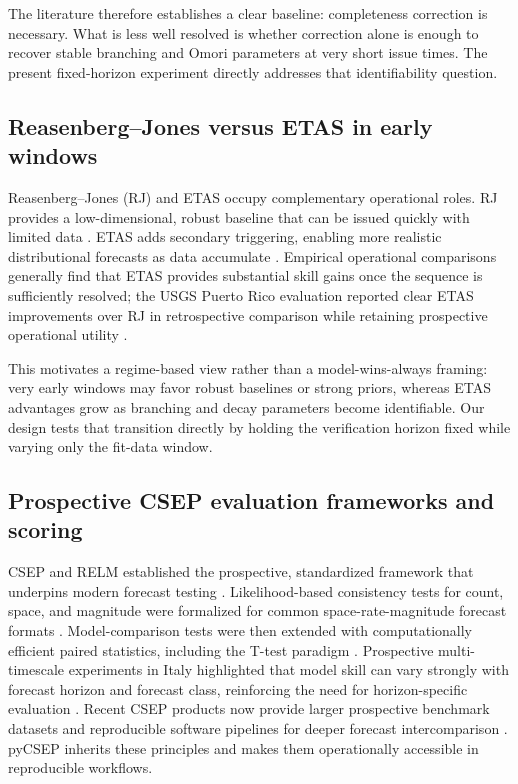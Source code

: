 \documentclass[12pt,letterpaper]{article}
\begin{document}
The literature therefore establishes a clear baseline: completeness correction
is necessary. What is less well resolved is whether correction alone is enough
to recover stable branching and Omori parameters at very short issue times.
The present fixed-horizon experiment directly addresses that identifiability
question.

\subsection{Reasenberg--Jones versus ETAS in early windows}

Reasenberg--Jones (RJ) and ETAS occupy complementary operational roles.
RJ provides a low-dimensional, robust baseline that can be issued quickly with
limited data \cite{reasenberg1989}. ETAS adds secondary triggering, enabling
more realistic distributional forecasts as data accumulate
\cite{ogata1988,ogata2006}. Empirical operational comparisons generally find
that ETAS provides substantial skill gains once the sequence is sufficiently
resolved; the USGS Puerto Rico evaluation reported clear ETAS improvements over
RJ in retrospective comparison while retaining prospective operational utility
\cite{puertorico2022}.

This motivates a regime-based view rather than a model-wins-always framing:
very early windows may favor robust baselines or strong priors, whereas ETAS
advantages grow as branching and decay parameters become identifiable.
Our design tests that transition directly by holding the verification horizon
fixed while varying only the fit-data window.

\subsection{Prospective CSEP evaluation frameworks and scoring}

CSEP and RELM established the prospective, standardized framework that underpins
modern forecast testing \cite{schorlemmer2007relm,schorlemmer2010relm}.
Likelihood-based consistency tests for count, space, and magnitude were
formalized for common space-rate-magnitude forecast formats
\cite{zechar2010likelihood}. Model-comparison tests were then extended with
computationally efficient paired statistics, including the T-test paradigm
\cite{rhoades2011efficient}. Prospective multi-timescale experiments in Italy
highlighted that model skill can vary strongly with forecast horizon and
forecast class, reinforcing the need for horizon-specific evaluation
\cite{taroni2018italy}. Recent CSEP products now provide larger prospective
benchmark datasets and reproducible software pipelines for deeper forecast
intercomparison \cite{serafini2025benchmark}. pyCSEP inherits these principles and makes them
operationally accessible in reproducible workflows.
\end{document}
